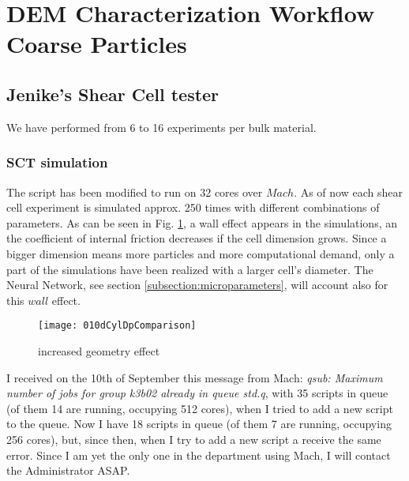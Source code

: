 
\section{DEM Characterization Workflow Coarse Particles}
\label{section:Demcharacterizationworkflowcoarseparticles}

\subsection{Jenike's  Shear Cell tester}
\label{subsection:jenikeshearcell}

We have performed from 6 to 16 experiments per bulk material.\\

\subsubsection{SCT simulation}
\label{subsubsection:sctsimulation}

The script has been modified to run on 32 cores over $Mach$. As of now each shear cell experiment is simulated approx. 250 times with different combinations of parameters.
As can be seen in Fig. \ref{010dCylDpComparison}, a wall effect appears in the simulations, an the coefficient of internal friction decreases if the cell dimension grows. Since a bigger dimension means more particles and more computational demand, only a part of the simulations have been realized with a larger cell's diameter. The Neural Network, see section \ref{subsection:microparameters}, will account also for this $wall$ effect.\\
\begin{figure}[!h]
\texttt{[image: 010dCylDpComparison]}
\caption{increased geometry effect}
\label{010dCylDpComparison}
\end{figure}

I received on the 10th of September this message from Mach: \textit{qsub: Maximum number of jobs for group k3b02 already in queue std.q}, with 35 scripts in queue (of them 14 are running, occupying 512 cores), when I tried to add a new script to the queue.
Now I have 18 scripts in queue (of them 7 are running, occupying 256 cores), but, since then, when I try to add a new script a receive the same error.
Since I am yet the only one in the department using Mach, I will contact the Administrator ASAP.\\

